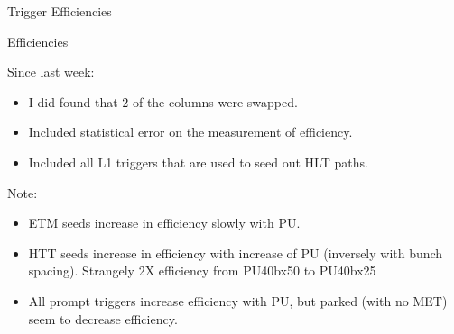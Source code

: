 \documentclass[8pt]{beamer}
\begin{document}
\begin{frame}{Trigger Efficiencies}

\begin{block}{Efficiencies}
 
\resizebox{\linewidth}{!}{}

\end{block}

{\tiny
Since last week:
\begin{itemize}
  \item I did found that 2 of the columns were swapped.
  \item Included statistical error on the measurement of efficiency.
  \item Included all L1 triggers that are used to seed out HLT paths.
\end{itemize}

Note:
\begin{itemize}
  \item ETM seeds increase in efficiency slowly with PU.
  \item HTT seeds increase in efficiency with increase of PU (inversely with bunch spacing). Strangely 2X efficiency from PU40bx50 to PU40bx25
  \item All prompt triggers increase efficiency with PU, but parked (with no MET) seem to decrease efficiency.
\end{itemize}
}

\end{frame}
\end{document}
